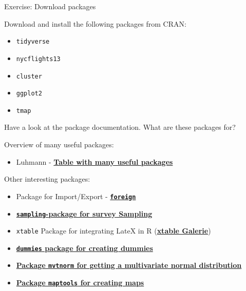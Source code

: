 \documentclass[
  10pt,
  ignorenonframetext,
]{beamer}
\providecommand{\tightlist}{%
  \setlength{\itemsep}{0pt}\setlength{\parskip}{0pt}}
\begin{document}
\begin{frame}[fragile]{Exercise: Download packages}
\protect\hypertarget{exercise-download-packages}{}

Download and install the following packages from CRAN:

\begin{itemize}
\tightlist
\item
  \texttt{tidyverse}
\item
  \texttt{nycflights13}
\item
  \texttt{cluster}
\item
  \texttt{ggplot2}
\item
  \texttt{tmap}
\end{itemize}

Have a look at the package documentation. What are these packages for?

\end{frame}

\begin{frame}[fragile]{Overview of many useful packages:}
\protect\hypertarget{overview-of-many-useful-packages}{}

\begin{itemize}
\tightlist
\item
  Luhmann -
  \href{http://www.beltz.de/fileadmin/beltz/downloads/OnlinematerialienPVU/28090_Luhmann/Verwendete\%20Pakete.pdf}{\textbf{Table
  with many useful packages}}
\end{itemize}

\begin{block}{Other interesting packages:}

\begin{itemize}
\item
  Package for Import/Export -
  \href{http://cran.r-project.org/web/packages/foreign/foreign.pdf}{\textbf{\texttt{foreign}}}
\item
  \href{http://iase-web.org/documents/papers/icots8/ICOTS8_4J1_TILLE.pdf}{\textbf{\texttt{sampling}-package
  for survey Sampling}}
\item
  \texttt{xtable} Package for integrating LateX in R
  (\href{http://cran.r-project.org/web/packages/xtable/vignettes/xtableGallery.pdf}{\textbf{xtable
  Galerie}})
\item
  \href{http://cran.r-project.org/web/packages/dummies/dummies.pdf}{\textbf{\texttt{dummies}
  package for creating dummies}}
\item
  \href{http://cran.r-project.org/web/packages/mvtnorm/index.html}{\textbf{Package
  \texttt{mvtnorm} for getting a multivariate normal distribution}}
\item
  \href{http://www.r-bloggers.com/tag/maptools/}{\textbf{Package
  \texttt{maptools} for creating maps}}
\end{itemize}

\end{block}

\end{frame}
\end{document}
